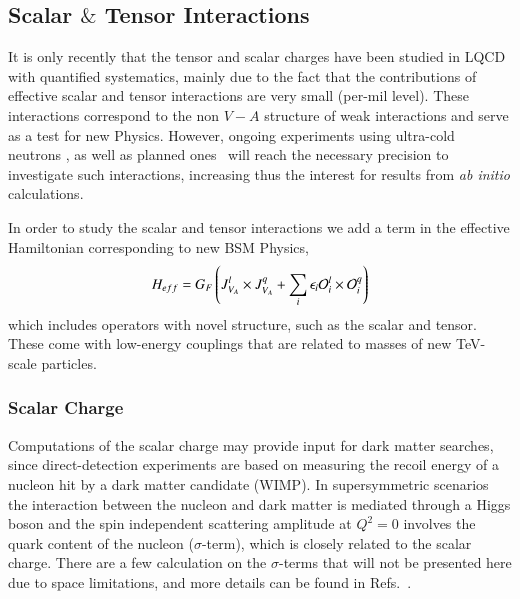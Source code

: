 \documentclass[epj]{webofc}
\newcommand{\be}{\begin{equation}}
\newcommand{\ee}{\end{equation}}
\begin{document}
\subsection{Scalar $\&$ Tensor Interactions}
\label{sub3_1}

It is only recently that the tensor and scalar charges have been studied in LQCD with quantified systematics, mainly due to the fact that the 
contributions of effective scalar and tensor interactions are very small (per-mil level). These interactions correspond to the non $V-A$ 
structure of weak interactions and serve as a test for new Physics.  
However, ongoing experiments using ultra-cold neutrons \cite{Abele:2002wc,Nico:2009zua,Young:2014mxa,Baessler:2014gia}, 
as well as planned ones~\cite{Bhattacharya:2011qm} will reach the necessary precision to investigate such interactions, increasing thus
the interest for results from {\it ab initio} calculations. 

In order to study the scalar and tensor interactions we add a term in
the effective Hamiltonian corresponding to new BSM Physics, 
%
\be
H_{eff} = G_F \left( J_{V_A}^{l}\times J_{V_A}^{q} + \sum_i \epsilon_i {\cal O}_i^l \times {\cal O}_i^q \right)
\ee
%
which includes operators with novel structure, such as the
scalar and tensor. These come with low-energy couplings that are
related to masses of new TeV-scale particles. 

\subsubsection{Scalar Charge}
\label{sub3_1_1}

Computations of the scalar charge may provide input for dark matter searches, since direct-detection experiments 
are based on measuring the recoil energy of a nucleon hit by a dark matter candidate (WIMP). In supersymmetric scenarios
\cite{Ellis:2010kf} the interaction between the nucleon and dark matter is mediated through a Higgs boson and the
spin independent scattering amplitude at $Q^2{=}0$ involves the quark content of the nucleon ($\sigma$-term), which is closely 
related to the scalar charge. There are  a few calculation on the $\sigma$-terms that will not be presented here
due to space limitations, and more details can be found in Refs.~\cite{Yang:2015uis,Abdel-Rehim:2016won,Bali:2016lvx}.
\end{document}
